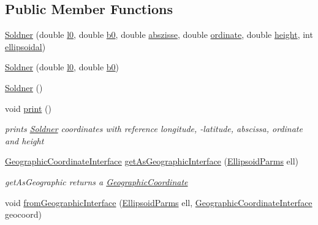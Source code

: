 \subsection*{Public Member Functions}
\begin{DoxyCompactItemize}
\item 
\hyperlink{classcoordinates_1_1_soldner_ab3e2a2c0566f9f12fa5d9c3460440a1a}{Soldner} (double \hyperlink{classcoordinates_1_1_soldner_a4d8a0b1f4fce55f1d8be6433a2160b17}{l0}, double \hyperlink{classcoordinates_1_1_soldner_a489fa7e9e4c0c09e502bbbf2fb7ad689}{b0}, double \hyperlink{classcoordinates_1_1_soldner_ab1bec5d8a11e84c0cdc3154fd1abf843}{abszisse}, double \hyperlink{classcoordinates_1_1_soldner_ab13e1d9275b47a0754ed33c572dba57a}{ordinate}, double \hyperlink{classcoordinates_1_1_soldner_a4db9877edcf2391422fe532bd7131856}{height}, int \hyperlink{classcoordinates_1_1_soldner_abef9061e0e316de4bba8f5e99292a2b5}{ellipsoidal})
\item 
\hyperlink{classcoordinates_1_1_soldner_a92132f86c35d526b8419f8bde4e0bc0e}{Soldner} (double \hyperlink{classcoordinates_1_1_soldner_a4d8a0b1f4fce55f1d8be6433a2160b17}{l0}, double \hyperlink{classcoordinates_1_1_soldner_a489fa7e9e4c0c09e502bbbf2fb7ad689}{b0})
\item 
\hyperlink{classcoordinates_1_1_soldner_a01998c873e25c1fbefb3aba8d1d24cdd}{Soldner} ()
\item 
void \hyperlink{classcoordinates_1_1_soldner_a672aec8c4424e5a066f272d4864e8813}{print} ()
\begin{DoxyCompactList}\small\item\em prints \hyperlink{classcoordinates_1_1_soldner}{Soldner} coordinates with reference longitude, -\/latitude, abscissa, ordinate and height \end{DoxyCompactList}\item 
\hyperlink{classcoordinates_1_1_geographic_coordinate_interface}{Geographic\+Coordinate\+Interface} \hyperlink{classcoordinates_1_1_soldner_ab87732c40411256ffd5cfba0ad4bd2cc}{get\+As\+Geographic\+Interface} (\hyperlink{classparams_1_1_ellipsoid_parms}{Ellipsoid\+Parms} ell)
\begin{DoxyCompactList}\small\item\em get\+As\+Geographic returns a \hyperlink{classcoordinates_1_1_geographic_coordinate}{Geographic\+Coordinate} \end{DoxyCompactList}\item 
void \hyperlink{classcoordinates_1_1_soldner_a5199877cccd7cfc4c450364c9d36acd6}{from\+Geographic\+Interface} (\hyperlink{classparams_1_1_ellipsoid_parms}{Ellipsoid\+Parms} ell, \hyperlink{classcoordinates_1_1_geographic_coordinate_interface}{Geographic\+Coordinate\+Interface} geocoord)

\end{DoxyCompactItemize}
